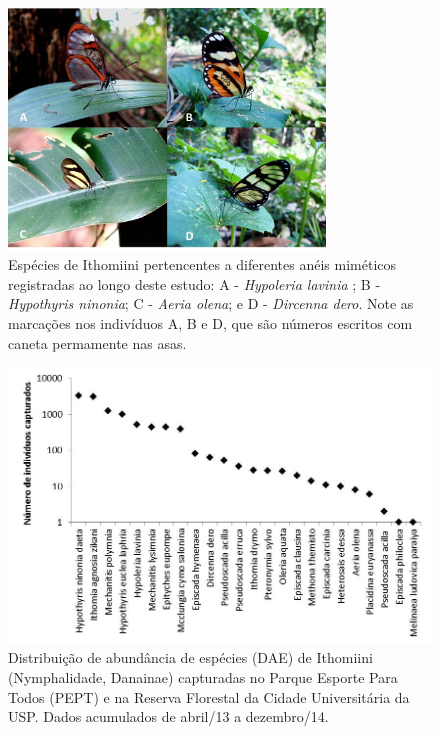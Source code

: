 \documentclass[12pt, A4]{article}
\begin{document}
\begin{figure}
  \centering
\includegraphics[width=0.75\textwidth]{figures/Imagem11/Imagem11}
  \caption{Espécies de Ithomiini pertencentes a diferentes anéis miméticos registradas ao longo deste estudo: A - \textit{Hypoleria lavinia} ; B - \textit{Hypothyris ninonia}; C - \textit{Aeria olena}; e D - \textit{Dircenna dero}. Note as marcações nos indivíduos A, B e D, que são números escritos com caneta permamente nas asas.}
\label{fig:2.1.1} 
\end{figure}

\begin{figure}
  \centering
\includegraphics[width=\textwidth]{figures/Imagem2/Imagem1.jpg}
  \caption{Distribuição de abundância de espécies (DAE) de Ithomiini (Nymphalidade, Danainae) 
    capturadas no Parque Esporte Para Todos (PEPT) e na Reserva Florestal da Cidade Universitária da USP. 
    Dados acumulados de abril/13 a dezembro/14.}
\label{fig:2.1.2} 
\end{figure}
\end{document}
